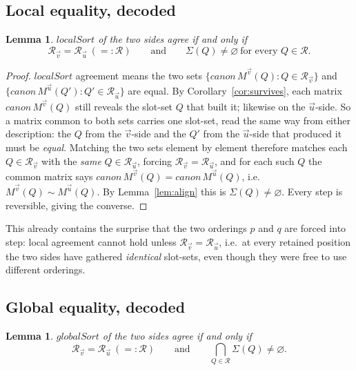 \documentclass{article}
\newtheorem{lemma}[theorem]{Lemma}
\begin{document}
\subsection*{Local equality, decoded}

\begin{lemma}\label{lem:localdecode}
$localSort$ of the two sides agree if and only if
\[
\mathcal R_{\vec v}=\mathcal R_{\vec u}\ (=:\mathcal R)
\qquad\text{and}\qquad
\Sigma(Q)\neq\varnothing\ \text{for every }Q\in\mathcal R.
\]
\end{lemma}

\begin{proof}
$localSort$ agreement means the two sets $\{canon\,M^{\vec v}(Q):Q\in\mathcal
R_{\vec v}\}$ and $\{canon\,M^{\vec u}(Q'):Q'\in\mathcal R_{\vec u}\}$ are equal.
By Corollary~\ref{cor:survives}, each matrix $canon\,M^{\vec v}(Q)$ still reveals
the slot-set $Q$ that built it; likewise on the $\vec u$-side.  So a matrix common
to both sets carries one slot-set, read the same way from either description: the
$Q$ from the $\vec v$-side and the $Q'$ from the $\vec u$-side that produced it must
be \emph{equal}.  Matching the two sets element by element therefore matches each
$Q\in\mathcal R_{\vec v}$ with the \emph{same} $Q\in\mathcal R_{\vec u}$, forcing
$\mathcal R_{\vec v}=\mathcal R_{\vec u}$, and for each such $Q$ the common matrix
says $canon\,M^{\vec v}(Q)=canon\,M^{\vec u}(Q)$, i.e.\ $M^{\vec v}(Q)\sim
M^{\vec u}(Q)$.  By Lemma~\ref{lem:align} this is $\Sigma(Q)\neq\varnothing$.  Every
step is reversible, giving the converse.
\end{proof}

This already contains the surprise that the two orderings $p$ and $q$ are forced
into step: local agreement cannot hold unless $\mathcal R_{\vec v}=\mathcal
R_{\vec u}$, i.e.\ at every retained position the two sides have gathered
\emph{identical} slot-sets, even though they were free to use different orderings.

\subsection*{Global equality, decoded}

\begin{lemma}\label{lem:globaldecode}
$globalSort$ of the two sides agree if and only if
\[
\mathcal R_{\vec v}=\mathcal R_{\vec u}\ (=:\mathcal R)
\qquad\text{and}\qquad
\bigcap_{Q\in\mathcal R}\Sigma(Q)\neq\varnothing .
\]
\end{lemma}
\end{document}
